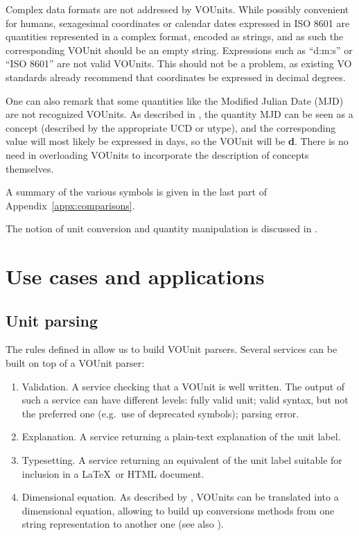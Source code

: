 \documentclass[11pt,notitlepage,onecolumn]{ivoa}
\def\eg{e.g.~}
\newcommand{\unit}[1]{\textbf{\textsf{\color{orange}#1}}}
\begin{document}
Complex data formats are not addressed by VOUnits. While possibly convenient for
humans, sexagesimal coordinates or calendar dates expressed in ISO 8601 are
quantities represented in a complex format, encoded as strings, and as such the
corresponding VOUnit should be an empty string. Expressions such as ``d:m:s'' or
``ISO 8601'' are not valid VOUnits. This should not be a problem, as existing VO 
standards already recommend that coordinates be expressed in decimal degrees.

One can also remark that some quantities like the Modified Julian Date (MJD) are 
not recognized VOUnits. As described in , the quantity MJD can be 
seen as a concept (described by the appropriate UCD or utype), and the corresponding
value will most likely be expressed in days, so the VOUnit will be \unit{d}. There is 
no need in overloading VOUnits to incorporate the description of concepts themselves.

A summary of the various symbols is given in the last part of Appendix~\ref{appx:comparisons}.

The notion of unit conversion and quantity manipulation is discussed in
.


\section{Use cases and applications\label{sec:useCase}}

\subsection{Unit parsing}

The rules defined in  allow us to build VOUnit parsers.
Several services can be built on top of a VOUnit parser:

\begin{enumerate}
\item Validation. A service checking that a VOUnit is well written. The output
of such a service can have different levels: fully valid unit; valid syntax, but
not the preferred one (\eg  use of deprecated symbols); parsing error. 
\item Explanation. A service returning a plain-text explanation of the unit label.
\item Typesetting. A service returning an equivalent of the unit label suitable for inclusion in
a \LaTeX\ or HTML document.
\item Dimensional equation. As described by \citet{osuna05}, VOUnits can be translated
into a dimensional equation, allowing to build up conversions methods from one string 
representation to another one (see also ). 
\end{enumerate}
\end{document}
